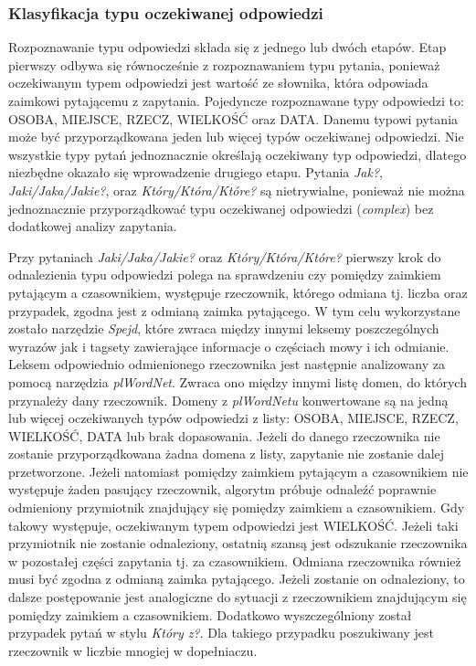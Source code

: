 \subsubsection{Klasyfikacja typu oczekiwanej odpowiedzi}
Rozpoznawanie typu odpowiedzi składa się z jednego lub dwóch etapów. Etap pierwszy odbywa się równocześnie z rozpoznawaniem typu pytania, ponieważ oczekiwanym typem odpowiedzi jest wartość ze słownika, która odpowiada zaimkowi pytającemu z zapytania. Pojedyncze rozpoznawane typy odpowiedzi to: OSOBA, MIEJSCE, RZECZ, WIELKOŚĆ oraz DATA. Danemu typowi pytania może być przyporządkowana jeden lub więcej typów oczekiwanej odpowiedzi. Nie wszystkie typy pytań jednoznacznie określają oczekiwany typ odpowiedzi, dlatego niezbędne okazało się wprowadzenie drugiego etapu. Pytania \emph{Jak?}, \emph{Jaki/Jaka/Jakie?}, oraz \emph{Który/Która/Które?} są nietrywialne, ponieważ nie można jednoznacznie przyporządkować typu oczekiwanej odpowiedzi (\emph{complex}) bez dodatkowej analizy zapytania. 

Przy pytaniach \emph{Jaki/Jaka/Jakie?} oraz \emph{Który/Która/Które?} pierwszy krok do odnalezienia typu odpowiedzi polega na sprawdzeniu czy pomiędzy zaimkiem pytającym a czasownikiem, występuje rzeczownik, którego odmiana tj. liczba oraz przypadek, zgodna jest z odmianą zaimka pytającego. W tym celu wykorzystane zostało narzędzie \emph{Spejd}, które zwraca między innymi leksemy poszczególnych wyrazów jak i tagsety zawierające informacje o częściach mowy i ich odmianie. Leksem odpowiednio odmienionego rzeczownika jest następnie analizowany za pomocą narzędzia \emph{plWordNet}. Zwraca ono między innymi listę domen, do których przynależy dany rzeczownik. Domeny z \emph{plWordNetu} konwertowane są na jedną lub więcej oczekiwanych typów odpowiedzi z listy: OSOBA, MIEJSCE, RZECZ, WIELKOŚĆ, DATA lub brak dopasowania. Jeżeli do danego rzeczownika nie zostanie przyporządkowana żadna domena z listy, zapytanie nie zostanie dalej przetworzone. Jeżeli natomiast pomiędzy zaimkiem pytającym a czasownikiem nie występuje żaden pasujący rzeczownik, algorytm próbuje odnaleźć poprawnie odmieniony przymiotnik znajdujący się pomiędzy zaimkiem a czasownikiem. Gdy takowy występuje, oczekiwanym typem odpowiedzi jest WIELKOŚĆ. 
Jeżeli taki przymiotnik nie zostanie odnaleziony, ostatnią szansą jest odszukanie rzeczownika w pozostałej części zapytania tj. za czasownikiem. Odmiana rzeczownika również musi być zgodna z odmianą zaimka pytającego. Jeżeli zostanie on odnaleziony, to dalsze postępowanie jest analogiczne do sytuacji z rzeczownikiem znajdującym się pomiędzy zaimkiem a czasownikiem. Dodatkowo wyszczególniony został przypadek pytań w stylu \emph{Który z?}. Dla takiego przypadku poszukiwany jest rzeczownik w liczbie mnogiej w dopełniaczu. 


